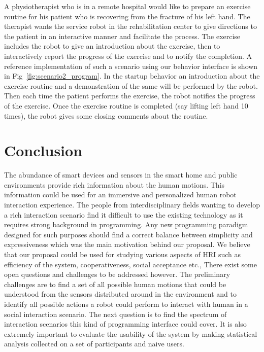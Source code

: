 \documentclass{llncs}
\begin{document}
A physiotherapist who is in a remote hospital would like to prepare an exercise routine for his patient who is recovering from the fracture of his left hand. The therapist wants the service robot in the rehabilitation center to give directions to the patient in an interactive manner and facilitate the process. The exercise includes the robot to give an introduction about the exercise, then to interactively report the progress of the exercise and to notify the completion. A reference implementation of such a scenario using our behavior interface is shown in Fig~\ref{fig:scenario2_program}. In the startup behavior an introduction about the exercise routine and a demonstration of the same will be performed by the robot. Then each time the patient performs the exercise, the robot notifies the progress of the exercise. Once the exercise routine is completed (say lifting left hand 10 times), the robot gives some closing comments about the routine.
\section{Conclusion}
The abundance of smart devices and sensors in the smart home and public environments provide rich information about the human motions. This information could be used for an immersive and personalized human robot interaction experience. The people from interdisciplinary fields wanting to develop a rich interaction scenario find it difficult to use the existing technology as it requires strong background in programming. Any new programming paradigm designed for such purposes should find a correct balance between simplicity and expressiveness which was the main motivation behind our proposal. We believe that our proposal could be used for studying various aspects of HRI such as efficiency of the system, cooperativeness, social acceptance etc., There exist some open questions and challenges to be addressed however. The preliminary challenges are to find a set of all possible human motions that could be understood from the sensors distributed around in the environment and to identify all possible actions a robot could perform to interact with human in a social interaction scenario. The next question is to find the spectrum of interaction scenarios this kind of programming interface could cover. It is also extremely important to evaluate the usability of the system by making statistical analysis collected on a set of participants and naive users.
\end{document}
